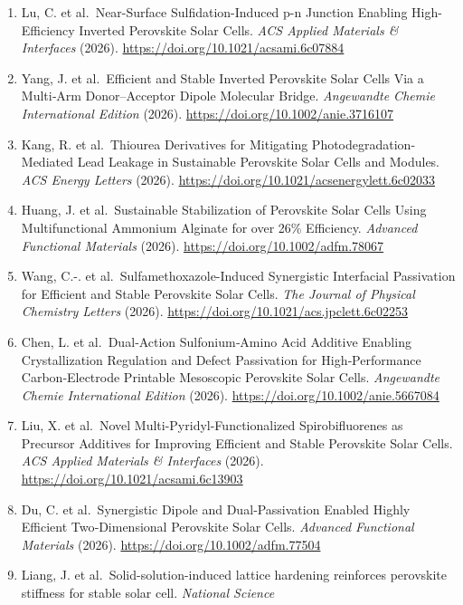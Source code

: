 \documentclass[
  11pt,
]{article}
\begin{document}
\begin{enumerate}
  Perovskite Solar Cells. \emph{Angewandte Chemie International Edition}
  (2026). \url{https://doi.org/10.1002/anie.6932848}
\item
  Lu, C. et al.~Near-Surface Sulfidation-Induced p-n Junction Enabling
  High-Efficiency Inverted Perovskite Solar Cells. \emph{ACS Applied
  Materials \& Interfaces} (2026).
  \url{https://doi.org/10.1021/acsami.6c07884}
\item
  Yang, J. et al.~Efficient and Stable Inverted Perovskite Solar Cells
  Via a Multi‐Arm Donor--Acceptor Dipole Molecular Bridge.
  \emph{Angewandte Chemie International Edition} (2026).
  \url{https://doi.org/10.1002/anie.3716107}
\item
  Kang, R. et al.~Thiourea Derivatives for Mitigating
  Photodegradation-Mediated Lead Leakage in Sustainable Perovskite Solar
  Cells and Modules. \emph{ACS Energy Letters} (2026).
  \url{https://doi.org/10.1021/acsenergylett.6c02033}
\item
  Huang, J. et al.~Sustainable Stabilization of Perovskite Solar Cells
  Using Multifunctional Ammonium Alginate for over 26\% Efficiency.
  \emph{Advanced Functional Materials} (2026).
  \url{https://doi.org/10.1002/adfm.78067}
\item
  Wang, C.-. et al.~Sulfamethoxazole-Induced Synergistic Interfacial
  Passivation for Efficient and Stable Perovskite Solar Cells. \emph{The
  Journal of Physical Chemistry Letters} (2026).
  \url{https://doi.org/10.1021/acs.jpclett.6c02253}
\item
  Chen, L. et al.~Dual‐Action Sulfonium‐Amino Acid Additive Enabling
  Crystallization Regulation and Defect Passivation for High‐Performance
  Carbon‐Electrode Printable Mesoscopic Perovskite Solar Cells.
  \emph{Angewandte Chemie International Edition} (2026).
  \url{https://doi.org/10.1002/anie.5667084}
\item
  Liu, X. et al.~Novel Multi-Pyridyl-Functionalized Spirobifluorenes as
  Precursor Additives for Improving Efficient and Stable Perovskite
  Solar Cells. \emph{ACS Applied Materials \& Interfaces} (2026).
  \url{https://doi.org/10.1021/acsami.6c13903}
\item
  Du, C. et al.~Synergistic Dipole and Dual‐Passivation Enabled Highly
  Efficient Two‐Dimensional Perovskite Solar Cells. \emph{Advanced
  Functional Materials} (2026). \url{https://doi.org/10.1002/adfm.77504}
\item
  Liang, J. et al.~Solid-solution-induced lattice hardening reinforces
  perovskite stiffness for stable solar cell. \emph{National Science
}
\end{enumerate}
\end{document}
